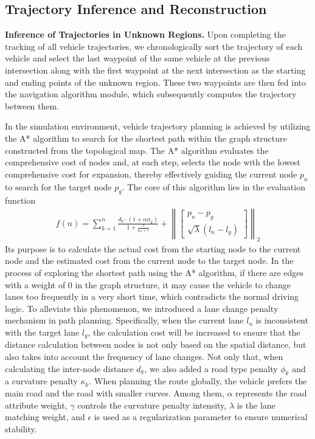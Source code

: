 \documentclass[lettersize,journal]{IEEEtran}
\begin{document}
\subsection{Trajectory Inference and Reconstruction}

\textbf{Inference of Trajectories in Unknown Regions.}
Upon completing the tracking of all vehicle trajectories, we chronologically sort the trajectory of each vehicle and select the last waypoint of the same vehicle at the previous intersection along with the first waypoint at the next intersection as the starting and ending points of the unknown region. 
These two waypoints are then fed into the navigation algorithm module, which subsequently computes the trajectory between them.

In the simulation environment, vehicle trajectory planning is achieved by utilizing the A* algorithm to search for the shortest path within the graph structure constructed from the topological map. 
The A* algorithm evaluates the comprehensive cost of nodes and, at each step, selects the node with the lowest comprehensive cost for expansion, thereby effectively guiding the current node \(p_{n}\) to search for the target node \(p_{g}\).
The core of this algorithm lies in the evaluation function 
\begin{align}
	f(n) = \sum_{k = 1}^{n} \frac{d_{k} \cdot\left(1+\alpha \phi_{k}\right)}{1 + \frac{\gamma}{\kappa_k + \epsilon}}+\left\|\left[\begin{array}{c}
		p_{n}-p_{g} \\
		\sqrt{\lambda}\left(l_{n}-l_{g}\right)
	\end{array}\right]\right\|_{2}
\end{align}
Its purpose is to calculate the actual cost from the starting node to the current node and the estimated cost from the current node to the target node. 
In the process of exploring the shortest path using the A* algorithm, if there are edges with a weight of 0 in the graph structure, it may cause the vehicle to change lanes too frequently in a very short time, which contradicts the normal driving logic. 
To alleviate this phenomenon, we introduced a lane change penalty mechanism in path planning. Specifically, when the current lane \(l_{n}\) is inconsistent with the target lane \(l_{g}\), the calculation cost will be increased to ensure that the distance calculation between nodes is not only based on the spatial distance, but also takes into account the frequency of lane changes. Not only that, when calculating the inter-node distance \(d_{k}\), we also added a road type penalty \(\phi_{k}\) and a curvature penalty \(\kappa_k\). When planning the route globally, the vehicle prefers the main road and the road with smaller curves. 
Among them, \(\alpha\) represents the road attribute weight, \(\gamma\) controls the curvature penalty intensity, \(\lambda\) is the lane matching weight, and \(\epsilon\) is used as a regularization parameter to ensure numerical stability.
\end{document}
